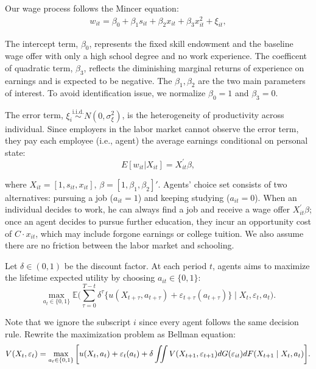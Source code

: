 \documentclass[a4paper, 12pt]{article}
\begin{document}
Our wage process follows the Mincer equation:
\begin{align}
w_{it}= \beta_0+\beta_1 s_{it}+\beta_2 x_{it} + \beta_3 x^2_{it} +  \xi_{it},
\label{mincer}
\end{align}


The intercept term, $\beta_0$, represents the fixed skill endowment and the baseline wage offer with only a high school degree and no work experience.
The coefficent of quadratic term, $\beta_3$, reflects the diminishing marginal returns of experience on earnings and is expected to be negative.
The $\beta_1, \beta_2$ are the two main parameters of interest. To avoid identification issue, we normalize $\beta_0 = 1$ and $\beta_3=0$.

The error term, $\xi_{i} \overset{\text{i.i.d.}}{\sim} N(0, \sigma^2_{\xi})$, is the heterogeneity of productivity across individual. 
Since employers in the labor market cannot observe the error term, they pay each employee (i.e., agent) the average earnings conditional on personal state:
\begin{equation}
E[w_{it}|X_{it}] = X_{it}^{\prime}\beta,
\end{equation}

where $X_{it}=[1, s_{it}, x_{it}],\,\beta=[1, \beta_1, \beta_2]'$.
Agents' choice set consists of two alternatives: pursuing a job ($a_{it} = 1$) and keeping studying ($a_{it} = 0$). 
When an individual decides to work, he can always find a job and receive a wage offer \(X_{it}^{\prime}\beta\); 
once an agent decides to pursue further education, they incur an opportunity cost of $C\cdot x_{it}$, 
which may include forgone earnings or college tuition.
We also assume there are no friction between the labor market and schooling.

Let $\delta \in (0,1)$ be the discount factor. At each period $t$, agents aims to maximize the lifetime expected utility by choosing $a_{it}\in\{0,1\}$:
\begin{equation}
\max_{a_t \in \{0,1\}}\mathbb{E} \bigg(  \sum_{\tau=0}^{T-t} \delta^{\tau} \{u(X_{t+\tau}, a_{t+\tau}) + \varepsilon_{t+\tau}(a_{t+\tau})\} \mid  X_{t},\varepsilon_t, a_{t} \bigg).
\label{bellman_eq}
\end{equation}

Note that we ignore the subscript $i$ since every agent follows the same decision rule. Rewrite the maximization problem as Bellman equation:
\begin{equation}
\small
V(X_{t}, \varepsilon_t) = \max_{a_{t} \in \{0,1\}} \bigg[ u( X_{t}, a_t) +  \varepsilon_{t}(a_{t}) + \delta \iint V(X_{t+1}, \varepsilon_{t+1})dG(\varepsilon_{it}) dF(X_{t+1} \mid X_{t},a_{t})\bigg].
\end{equation}
\end{document}
